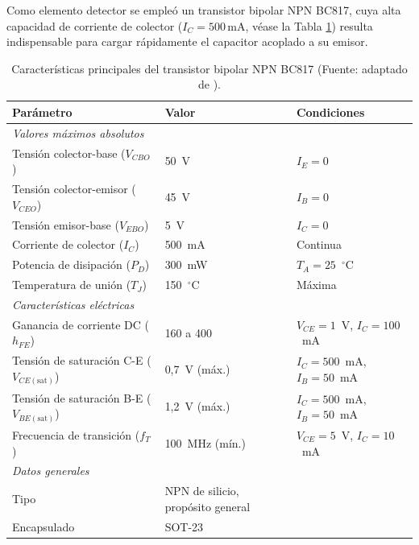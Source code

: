 Como elemento detector se empleó un transistor bipolar NPN BC817, cuya alta capacidad de corriente de colector ($I_C = 500\,\text{mA}$, véase la Tabla \ref{tab:caracteristicas_bc817}) resulta indispensable para cargar rápidamente el capacitor acoplado a su emisor.

\begin{table}[h]
  \centering
  \begin{tabular}{lll}
    \toprule
    \textbf{Parámetro} & \textbf{Valor} & \textbf{Condiciones} \\
    \midrule
    \multicolumn{3}{l}{\textit{Valores máximos absolutos}} \\
    Tensión colector-base ($V_{CBO}$)   & 50~V             & $I_E = 0$        \\
    Tensión colector-emisor ($V_{CEO}$) & 45~V             & $I_B = 0$        \\
    Tensión emisor-base ($V_{EBO}$)     & 5~V              & $I_C = 0$        \\
    Corriente de colector ($I_C$)       & 500~mA           & Continua         \\
    Potencia de disipación ($P_D$)      & 300~mW           & $T_A = 25$~$^{\circ}$C \\
    Temperatura de unión ($T_J$)        & 150~$^{\circ}$C  & Máxima           \\
    \midrule
    \multicolumn{3}{l}{\textit{Características eléctricas}} \\
    Ganancia de corriente DC ($h_{FE}$)      & 160 a 400            & $V_{CE}=1$~V, $I_C=100$~mA \\
    Tensión de saturación C-E ($V_{CE(\text{sat})}$)& 0,7~V (máx.)         & $I_C=500$~mA, $I_B=50$~mA  \\
    Tensión de saturación B-E ($V_{BE(\text{sat})}$)& 1,2~V (máx.)         & $I_C=500$~mA, $I_B=50$~mA  \\
    Frecuencia de transición ($f_T$)         & 100~MHz (mín.)       & $V_{CE}=5$~V, $I_C=10$~mA  \\
    \midrule
    \multicolumn{3}{l}{\textit{Datos generales}} \\
    Tipo        & NPN de silicio, propósito general & \\
    Encapsulado & SOT-23                            & \\
    \bottomrule
  \end{tabular}
  \caption{Características principales del transistor bipolar NPN BC817 (Fuente: adaptado de \cite{bc817_ds}).}
  \label{tab:caracteristicas_bc817}
\end{table}

